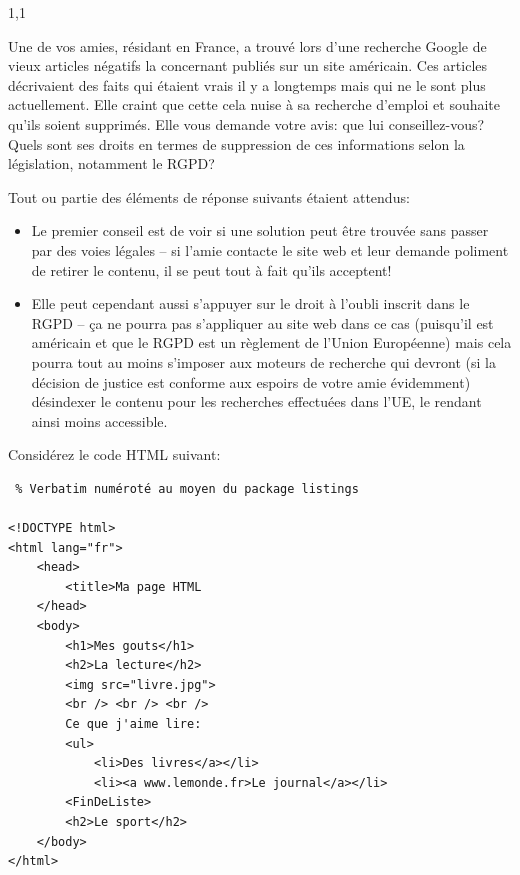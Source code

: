 \documentclass[11pt,a4paper]{exam}
\begin{document}
\begin{spacing}{1,1}
\begin{questions}
        	\question[2] Une de vos amies, résidant en France, a trouvé lors d'une recherche Google de vieux articles négatifs la concernant publiés sur un site américain. Ces articles décrivaient des faits qui étaient vrais il y a longtemps mais qui ne le sont plus actuellement. Elle craint que cette cela nuise à sa recherche d'emploi et souhaite qu'ils soient supprimés. Elle vous demande votre avis: que lui conseillez-vous? Quels sont ses droits en termes de suppression de ces informations selon la législation, notamment le RGPD?
        	\begin{solution}
        		Tout ou partie des éléments de réponse suivants étaient attendus:
        		\begin{itemize}
        			\item Le premier conseil est de voir si une solution peut être trouvée sans passer par des voies légales -- si l'amie contacte le site web et leur demande poliment de retirer le contenu, il se peut tout à fait qu'ils acceptent!
        			\item Elle peut cependant aussi s'appuyer sur le droit à l'oubli inscrit dans le RGPD -- ça ne pourra pas s'appliquer au site web dans ce cas (puisqu'il est américain et que le RGPD est un règlement de l'Union Européenne) mais cela pourra tout au moins s'imposer aux moteurs de recherche qui devront (si la décision de justice est conforme aux espoirs de votre amie évidemment) désindexer le contenu pour les recherches effectuées dans l'UE, le rendant ainsi moins accessible.
        		\end{itemize}
        	\end{solution}
        	
        	\question Considérez le code HTML suivant:
        	\begin{lstlisting} % Verbatim numéroté au moyen du package listings

<!DOCTYPE html>
<html lang="fr">
    <head>
        <title>Ma page HTML
    </head>
    <body>
        <h1>Mes gouts</h1>
        <h2>La lecture</h2>
        <img src="livre.jpg">
        <br /> <br /> <br />
        Ce que j'aime lire:
        <ul>
            <li>Des livres</a></li>
            <li><a www.lemonde.fr>Le journal</a></li>
        <FinDeListe>
        <h2>Le sport</h2>
    </body>
</html>
        	\end{lstlisting}
        	
        	\begin{parts}

\end{parts}
\end{questions}
\end{spacing}
\end{document}
